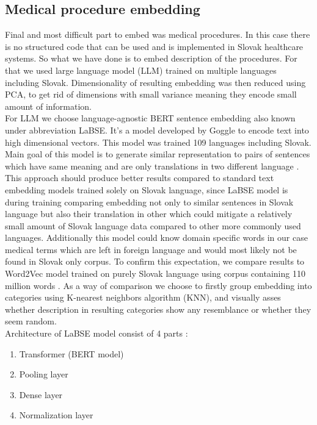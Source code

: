 \subsection{Medical procedure embedding}

Final and most difficult part to embed was medical procedures. In this case there is no structured code that can be used and is implemented in Slovak healthcare systems. So what we have done is to embed description of the procedures. For that we used large language model (LLM) trained on multiple languages including Slovak. Dimensionality of resulting embedding was then reduced using PCA, to get rid of dimensions with small variance meaning they encode small amount of information. 
\\

For LLM we choose language-agnostic BERT sentence embedding also known under abbreviation LaBSE. It's a model developed by Goggle to encode text into high dimensional vectors. This model was trained 109 languages including Slovak. Main goal of this model is to generate similar representation to pairs of sentences which have same meaning and are only translations in two different language \cite{labse_kaggle}. This approach should produce better results compared to standard text embedding models trained solely on Slovak language, since LaBSE model is during training comparing embedding not only to similar sentences in Slovak language but also their translation in other which could mitigate a relatively small amount of Slovak language data compared to other more commonly used languages. Additionally this model could know domain specific words in our case medical terms which are left in foreign language and would most likely not be found in Slovak only corpus. To confirm this expectation, we compare results to Word2Vec model trained on purely Slovak language using corpus containing 110 million words \cite{word2vec}. As a way of comparison we choose to  firstly group embedding into categories using K-nearest neighbors algorithm (KNN), and visually asses whether description in resulting categories show any resemblance or whether they seem random. 
\\
Architecture of LaBSE model consist of 4 parts \cite{labse_hug}:

\begin{enumerate}
	\item Transformer (BERT model)
	\item Pooling layer
	\item Dense layer
	\item Normalization layer
\end{enumerate}

